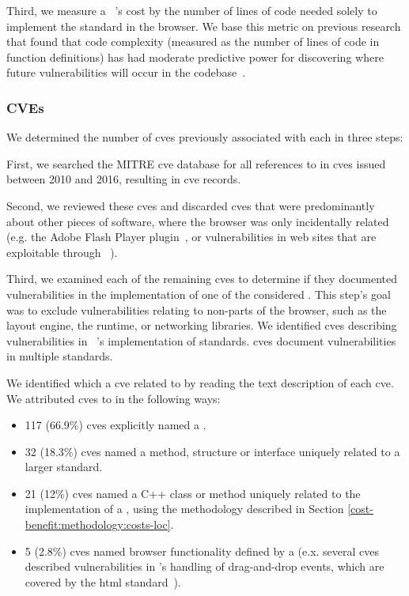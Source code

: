 Third, we measure a \WAS~'s cost by the number of lines of code
needed solely to implement the standard in the browser. We base this metric
on previous research that found that code complexity (measured as the
number of lines of code in function definitions) has had moderate predictive
power for discovering where future vulnerabilities will occur in the
\FF codebase~\cite{shin2011evaluating}.


\subsubsection{CVEs}
\label{cost-benefit:methodology:costs-cves}
We determined the number of \gls{cve}s previously associated with each
\WAS in three steps:

First, we searched the MITRE \gls{cve} database for all references to \FF in
\gls{cve}s issued between 2010 and 2016, resulting in \NumFirefoxCVEs \gls{cve}
records.

Second, we reviewed these \gls{cve}s and discarded \NumFirefoxCVEsOther
\gls{cve}s that were predominantly about other pieces of software, where the
browser was only incidentally related (e.g. the Adobe Flash Player
plugin~\cite{cve_2012_4171}, or vulnerabilities in web sites that are
exploitable through \FF~\cite{cve_2013_2031}).

Third, we examined each of the remaining \gls{cve}s to
determine if they documented vulnerabilities in the implementation of one of the
\NumStandards considered \WASs.  This step's goal was to exclude vulnerabilities
relating to non-\WAPI parts of the browser, such as the layout engine,
the \JS runtime, or networking libraries.
We identified \NumFirefoxStandardCVEs \gls{cve}s describing vulnerabilities in
\FF~'s implementation of \NumStandardsWithCVE standards.
\NumCVEsWithMultipleStandards \gls{cve}s document vulnerabilities in multiple
standards.

We identified which \WAS a \gls{cve} related to by reading the text
description of each \gls{cve}. We attributed \gls{cve}s to \WASs
in the following ways:

\begin{itemize}
  \item 117 (66.9\%) \gls{cve}s explicitly named a \WAS.
  \item 32 (18.3\%) \gls{cve}s named a \JS method, structure
        or interface uniquely related to a larger standard.
  \item 21 (12\%) \gls{cve}s named a C++ class or method uniquely
        related to the implementation of a \WAS, using the methodology described
        in Section \ref{cost-benefit:methodology:costs-loc}.
  \item 5 (2.8\%) \gls{cve}s named browser functionality defined by a \WAS
        (e.x. several \gls{cve}s described vulnerabilities in \FF's handling of
        drag-and-drop events, which are covered by the \gls{html}
        standard~\cite{whatwg2018html}).
\end{itemize}

